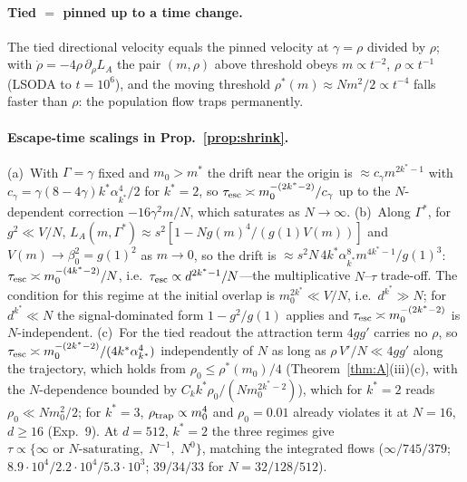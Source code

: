 \paragraph{Tied $=$ pinned up to a time change.} The tied directional velocity equals the pinned velocity at $\gamma=\rho$ divided by $\rho$;
with $\dot\rho=-4\rho\,\partial_\rho L_A$ the pair $(m,\rho)$ above threshold obeys $m\propto t^{-2}$, $\rho\propto t^{-1}$ (LSODA to $t=10^6$), and
the moving threshold $\rho^*(m)\approx Nm^2/2\propto t^{-4}$ falls faster than $\rho$: the population flow traps permanently.

\paragraph{Escape-time scalings in Prop.~\ref{prop:shrink}.} (a)~With $\Gamma=\gamma$ fixed and $m_0>m^*$ the drift near the origin is
$\approx c_\gamma m^{2k^*-1}$ with $c_\gamma=\gamma(8-4\gamma)k^*\alpha_{k^*}^4/2$ for $k^*=2$, so $\tau_{\rm esc}\asymp m_0^{-(2k^*-2)}/c_\gamma$ up to the $N$-dependent
correction $-16\gamma^2m/N$, which saturates as $N\to\infty$. (b)~Along $\Gamma^*$, for $g^2\ll V/N$,
$L_A(m,\Gamma^*)\approx s^2[1-N g(m)^4/(g(1)V(m))]$ and $V(m)\to\beta_0^2=g(1)^2$ as $m\to0$, so the drift is $\approx s^2 N\,4k^*\alpha_{k^*}^8 m^{4k^*-1}/g(1)^3$:
$\tau_{\rm esc}\asymp m_0^{-(4k^*-2)}/N$, i.e.\ $\tau_{\rm esc}\propto d^{2k^*-1}/N$---the multiplicative $N$--$\tau$ trade-off. The condition for this
regime at the initial overlap is $m_0^{2k^*}\ll V/N$, i.e.\ $d^{k^*}\gg N$; for $d^{k^*}\ll N$ the signal-dominated form $1-g^2/g(1)$ applies and
$\tau_{\rm esc}\asymp m_0^{-(2k^*-2)}$ is $N$-independent. (c)~For the tied readout the attraction term $4gg'$ carries no $\rho$, so
$\tau_{\rm esc}\asymp m_0^{-(2k^*-2)}/(4k^*\alpha_{k^*}^4)$ independently of $N$ as long as $\rho\,V'/N\ll 4gg'$ along the trajectory, which holds
from $\rho_0\le\rho^*(m_0)/4$ (Theorem~\ref{thm:A}(iii)(c), with the $N$-dependence bounded by $C_k k^*\rho_0/(Nm_0^{2k^*-2})$), which for $k^*=2$ reads $\rho_0\ll Nm_0^2/2$; for $k^*=3$, $\rho_{\rm trap}\propto m_0^4$ and $\rho_0=0.01$ already violates it at $N=16$, $d\ge16$ (Exp.~9). At $d=512$, $k^*=2$ the three regimes give $\tau\propto\{\infty\text{ or }N\text{-saturating},\;N^{-1},\;N^0\}$, matching the
integrated flows ($\infty/745/379$; $8.9\cdot10^4/2.2\cdot10^4/5.3\cdot10^3$; $39/34/33$ for $N=32/128/512$).

